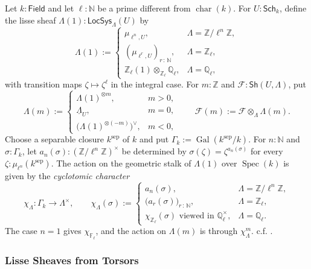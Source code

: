 \documentclass[11pt,letterpaper]{article}
\theoremstyle{numberfirstplain}
\numberwithin{equation}{theorem}
\theoremstyle{numberfirstupright}
\begin{document}
\begin{samepage}
\begin{definition}\label{def:tate-twists-cyclotomic-character}
Let $k:\mathsf{Field}$ and let $\ell:\mathbb N$ be a prime different from $\operatorname{char}(k)$. For $U:\mathsf{Sch}_k$, define the lisse sheaf $\Lambda(1):\mathsf{LocSys}_\Lambda(U)$ by
\[
\Lambda(1):=\begin{cases}
\mu_{\ell^n,U}, & \Lambda=\mathbb Z/\ell^n\mathbb Z,\\[3pt]
(\mu_{\ell^r,U})_{r\,:\,\mathbb N}, & \Lambda=\mathbb Z_\ell,\\[3pt]
\mathbb Z_\ell(1)\otimes_{\mathbb Z_\ell}\mathbb Q_\ell, & \Lambda=\mathbb Q_\ell,
\end{cases}
\]
with transition maps $\zeta\mapsto\zeta^\ell$ in the integral case. For $m:\mathbb Z$ and $\mathcal F:\mathsf{Sh}(U,\Lambda)$, put
\[
\Lambda(m):=\begin{cases}
\Lambda(1)^{\otimes m}, & m>0,\\[3pt]
\underline{\Lambda}_U, & m=0,\\[3pt]
\bigl(\Lambda(1)^{\otimes(-m)}\bigr)^\vee, & m<0,
\end{cases}
\qquad
\mathcal F(m):=\mathcal F\otimes_\Lambda\Lambda(m).
\]
Choose a separable closure $k^{\mathrm{sep}}$ of $k$ and put $\Gamma_k:=\operatorname{Gal}(k^{\mathrm{sep}}/k)$. For $n:\mathbb N$ and $\sigma:\Gamma_k$, let $a_n(\sigma):(\mathbb Z/\ell^n\mathbb Z)^\times$ be determined by $\sigma(\zeta)=\zeta^{a_n(\sigma)}$ for every $\zeta:\mu_{\ell^n}(k^{\mathrm{sep}})$.
The action on the geometric stalk of $\Lambda(1)$ over $\operatorname{Spec}(k)$ is given by the \textit{cyclotomic character}
\[
\chi_\Lambda:\Gamma_k\to\Lambda^\times,
\qquad
\chi_\Lambda(\sigma):=\begin{cases}
a_n(\sigma), & \Lambda=\mathbb Z/\ell^n\mathbb Z,\\[3pt]
\bigl(a_r(\sigma)\bigr)_{r\,:\,\mathbb N}, & \Lambda=\mathbb Z_\ell,\\[3pt]
\chi_{\mathbb Z_\ell}(\sigma)\text{ viewed in }\mathbb Q_\ell^\times, & \Lambda=\mathbb Q_\ell.
\end{cases}
\]
The case $n=1$ gives $\chi_{\mathbb F_\ell}$, and the action on $\Lambda(m)$ is through $\chi_\Lambda^m$. c.f. \cite[Chapter~I, \S13]{Milne2008AbelianVarieties}.
\end{definition}
\end{samepage}

\subsubsection{Lisse Sheaves from Torsors}\label{app:torsor-sheaf-corrections}
\end{document}
